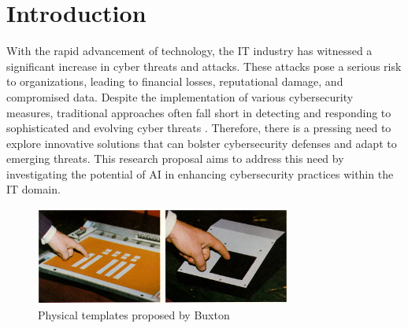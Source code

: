 \documentclass[a4paper,man,12pt]{article}
\begin{document}
\section{Introduction}

  
  With the rapid advancement of technology, the IT industry has witnessed a significant increase in cyber threats and attacks. These attacks pose a serious risk to organizations, leading to financial losses, reputational damage, and compromised data. Despite the implementation of various cybersecurity measures, traditional approaches often fall short in detecting and responding to sophisticated and evolving cyber threats \parencite{001}. Therefore, there is a pressing need to explore innovative solutions that can bolster cybersecurity defenses and adapt to emerging threats. This research proposal aims to address this need by investigating the potential of AI in enhancing cybersecurity practices within the IT domain.

  
  \begin{figure}[!htbp] 
    \centering
    \includegraphics[width=0.75\textwidth]{images/buxton.PNG}
    \caption{Physical templates proposed by Buxton \parencite{010}}
    \label{fig:buxton}
  \end{figure}

  
\end{document}
